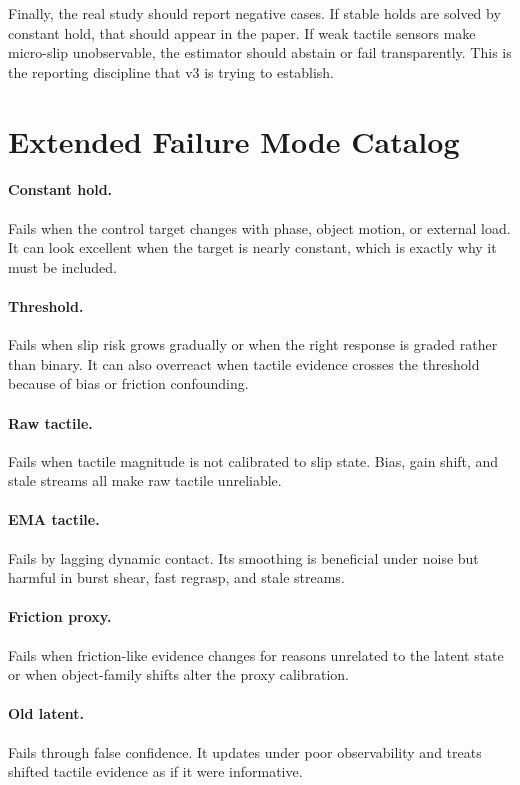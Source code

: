 \documentclass{article}
\begin{document}
Finally, the real study should report negative cases. If stable holds are solved by constant hold, that should appear in the paper. If weak tactile sensors make micro-slip unobservable, the estimator should abstain or fail transparently. This is the reporting discipline that v3 is trying to establish.

\section{Extended Failure Mode Catalog}

\paragraph{Constant hold.}
Fails when the control target changes with phase, object motion, or external load. It can look excellent when the target is nearly constant, which is exactly why it must be included.

\paragraph{Threshold.}
Fails when slip risk grows gradually or when the right response is graded rather than binary. It can also overreact when tactile evidence crosses the threshold because of bias or friction confounding.

\paragraph{Raw tactile.}
Fails when tactile magnitude is not calibrated to slip state. Bias, gain shift, and stale streams all make raw tactile unreliable.

\paragraph{EMA tactile.}
Fails by lagging dynamic contact. Its smoothing is beneficial under noise but harmful in burst shear, fast regrasp, and stale streams.

\paragraph{Friction proxy.}
Fails when friction-like evidence changes for reasons unrelated to the latent state or when object-family shifts alter the proxy calibration.

\paragraph{Old latent.}
Fails through false confidence. It updates under poor observability and treats shifted tactile evidence as if it were informative.
\end{document}
